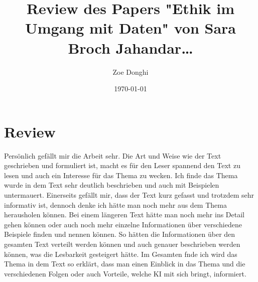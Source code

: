\documentclass{article}
\title{Review des Papers "Ethik im Umgang mit Daten" von Sara Broch Jahandar\dots}
\author{Zoe Donghi}
\date{\today}
\begin{document}
\maketitle


\section{Review}
Persönlich gefällt mir die Arbeit sehr. Die Art und Weise wie der Text geschrieben und formuliert ist, macht es für den Leser spannend den Text zu lesen und auch ein Interesse für das Thema zu wecken.
Ich finde das Thema wurde in dem Text sehr deutlich beschrieben und auch mit Beispielen untermauert. 
Einerseits gefällt mir, dass der Text kurz gefasst und trotzdem sehr informativ ist, dennoch denke ich hätte man noch mehr aus dem Thema herausholen können.
Bei einem längeren Text hätte man noch mehr ins Detail gehen können oder auch noch mehr einzelne Informationen über verschiedene Beispiele finden und nennen können.
So hätten die Informationen über den gesamten Text verteilt werden können und auch genauer beschrieben werden können, was die Lesbarkeit gesteigert hätte. 
Im Gesamten fnde ich wird das Thema in dem Text so erklärt, dass man einen Einblick in das Thema und die verschiedenen Folgen oder auch Vorteile, welche KI mit sich bringt, informiert.


\printbibliography
\end{document}
